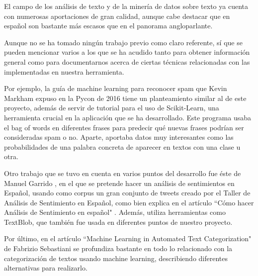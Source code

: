 
El campo de los análisis de texto y de la minería de datos sobre texto ya cuenta con numerosas aportaciones de gran calidad, aunque cabe destacar que en español son bastante más escasos que en el panorama angloparlante.

Aunque no se ha tomado ningún trabajo previo como claro referente, sí que se pueden mencionar varios a los que se ha acudido tanto para obtener información general como para documentarnos acerca de ciertas técnicas relacionadas con las implementadas en nuestra herramienta.

Por ejemplo, la guía de machine learning para reconocer spam que Kevin Markham expuso en la Pycon de 2016 \cite{spamtutorial} tiene un planteamiento similar al de este proyecto, además de servir de tutorial para el uso de Scikit-Learn, una herramienta crucial en la aplicación que se ha desarrollado. Este programa usaba el bag of words en diferentes frases para predecir qué nuevas frases podrían ser consideradas spam o no. Aparte, aportaba datos muy interesantes como las probabilidades de una palabra concreta de aparecer en textos con una clase u otra.

Otro trabajo que se tuvo en cuenta en varios puntos del desarrollo fue éste de Manuel Garrido \cite{tweetsmap}, en el que se pretende hacer un análisis de sentimientos en Español, usando como corpus un gran conjunto de tweets creado por el Taller de Análisis de Sentimiento en Español, como bien explica en el artículo ``Cómo hacer Análisis de Sentimiento en español" \cite{spanishsentiment}. Además, utiliza herramientas como TextBlob, que también fue usada en diferentes puntos de nuestro proyecto.

Por último, en el artículo ``Machine Learning in Automated Text Categorization" \cite{Sebastiani:2002:MLA:505282.505283} de Fabrizio Sebastiani se profundiza bastante en todo lo relacionado con la categorización de textos usando machine learning, describiendo diferentes alternativas para realizarlo.